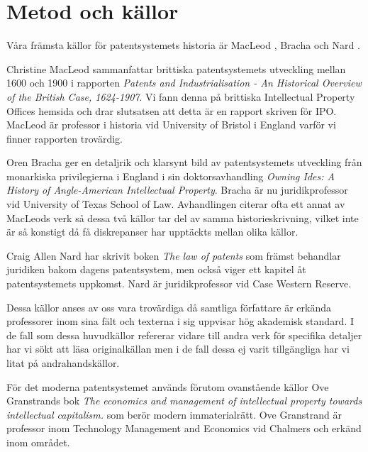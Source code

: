 \section{Metod och källor}

Våra främsta källor för patentsystemets historia är MacLeod \cite{macleod},
Bracha \cite{bracha} och Nard \cite{nard}.

Christine MacLeod sammanfattar brittiska patentsystemets utveckling mellan 
1600 och 1900 i rapporten \emph{Patents and Industrialisation - An Historical 
Overview of the British Case, 1624-1907}. Vi fann denna på brittiska 
Intellectual Property Offices hemsida och drar slutsatsen att detta är en 
rapport skriven för IPO. MacLeod är professor i historia vid University of 
Bristol i England varför vi finner rapporten trovärdig.

Oren Bracha ger en detaljrik och klarsynt bild av patentsystemets utveckling 
från monarkiska privilegierna i England i sin doktorsavhandling \emph{Owning 
Ides: A History of Angle-American Intellectual Property}. Bracha är nu 
juridikprofessor vid University of Texas School of Law. Avhandlingen citerar 
ofta ett annat av MacLeods verk så dessa två källor tar del av samma 
historieskrivning, vilket inte är så konstigt då få diskrepanser har upptäckts 
mellan olika källor.

Craig Allen Nard har skrivit boken \emph{The law of patents} som främst 
behandlar juridiken bakom dagens patentsystem, men också viger ett kapitel åt 
patentsystemets uppkomst. Nard är juridikprofessor vid Case Western Reserve.

Dessa källor anses av oss vara trovärdiga då samtliga författare är erkända 
professorer inom sina fält och texterna i sig uppvisar hög akademisk standard. 
I de fall som dessa huvudkällor refererar vidare till andra verk för 
specifika detaljer har vi sökt att läsa originalkällan men i de fall dessa ej 
varit tillgängliga har vi litat på andrahandskällor.

För det moderna patentsystemet används förutom ovanstående källor Ove Granstrands bok
\emph{The economics and management of intellectual property towards intellectual capitalism.}\cite{ove}
som berör modern immaterialrätt. Ove Granstrand är professor inom
Technology Management and Economics vid Chalmers och erkänd inom området.





